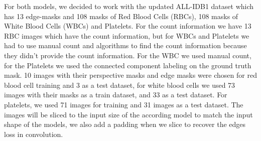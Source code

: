 \documentclass[conference]{IEEEtran}
\begin{document}
For both models, we decided to work with the updated ALL-IDB1 dataset which has 13 edge-masks and 108 masks of Red Blood Cells (RBCs), 108 masks of White Blood Cells (WBCs) and Platelets. For the count information we have 13 RBC images which have the count information, but for WBCs and Platelets we had to use manual count and algorithms to find the count information because they didn’t provide the count information. For the WBC we used manual count, for the Platelets we used the connected component labeling on the ground truth mask. 10 images with their perspective masks and edge masks were chosen for red blood cell training and 3 as a test dataset, for white blood cells we used 73 images with their masks as a train dataset, and 33 as a test dataset. For platelets, we used 71 images for training and 31 images as a test dataset. The images will be sliced to the input size of the according model to match the input shape of the models, we also add a padding when we slice to recover the edges loss in convolution.
\end{document}
